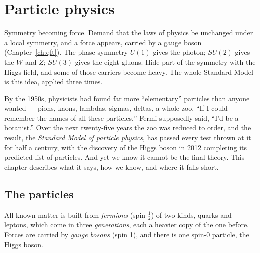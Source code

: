\chapter{Particle physics}
\label{ch:particle}



\begin{prototype}
Symmetry becoming force. Demand that the laws of physics be unchanged under a local symmetry, and a force appears, carried by a gauge boson (Chapter~\ref{ch:qft}). The phase symmetry $U(1)$ gives the photon; $SU(2)$ gives the $W$ and $Z$; $SU(3)$ gives the eight gluons. Hide part of the symmetry with the Higgs field, and some of those carriers become heavy. The whole Standard Model is this idea, applied three times.
\end{prototype}

By the 1950s, physicists had found far more ``elementary'' particles than anyone wanted --- pions, kaons, lambdas, sigmas, deltas, a whole zoo. ``If I could remember the names of all these particles,'' Fermi supposedly said, ``I'd be a botanist.'' Over the next twenty-five years the zoo was reduced to order, and the result, the \emph{Standard Model of particle physics}, has passed every test thrown at it for half a century, with the discovery of the Higgs boson in 2012 completing its predicted list of particles. And yet we know it cannot be the final theory. This chapter describes what it says, how we know, and where it falls short.

\section{The particles}

All known matter is built from \emph{fermions} (spin $\tfrac12$) of two kinds, quarks and leptons, which come in three \emph{generations}, each a heavier copy of the one before. Forces are carried by \emph{gauge bosons} (spin 1), and there is one spin-0 particle, the Higgs boson.

